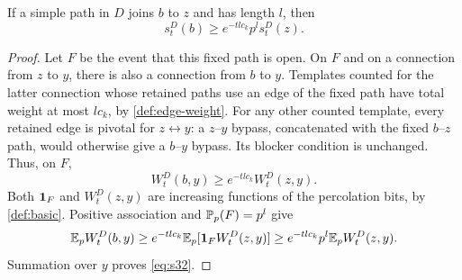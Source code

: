 \begin{lemma}\label{def:endpoint}
If a simple path in $D$ joins $b$ to $z$ and has length $l$, then
\begin{equation}\label{eq:s32}
 s_t^D(b)\ge e^{-tlc_k}p^l s_t^D(z).
\end{equation}
\end{lemma}

\begin{proof}
Let $F$ be the event that this fixed path is open.  On $F$ and on a
connection from $z$ to $y$, there is also a connection from $b$ to $y$.
Templates counted for the latter connection whose retained paths use an
edge of the fixed path have total weight at most $lc_k$, by
\eqref{def:edge-weight}.  For any other counted template, every retained
edge is pivotal for $z\leftrightarrow y$: a $z$--$y$ bypass, concatenated
with the fixed $b$--$z$ path, would otherwise give a $b$--$y$ bypass.
Its blocker condition is unchanged.  Thus, on $F$,
\[
 W_t^D(b,y)\ge e^{-tlc_k}W_t^D(z,y).
\]
Both $\mathbf 1_F$ and $W_t^D(z,y)$ are increasing functions of the percolation
bits, by \cref{def:basic}.  Positive association and $\mathbb P_p(F)=p^l$
give
\[
 \mathbb E_pW_t^D(b,y)
 \ge e^{-tlc_k}\mathbb E_p[\mathbf 1_FW_t^D(z,y)]
 \ge e^{-tlc_k}p^l\mathbb E_pW_t^D(z,y).
\]
Summation over $y$ proves \eqref{eq:s32}.
\end{proof}
